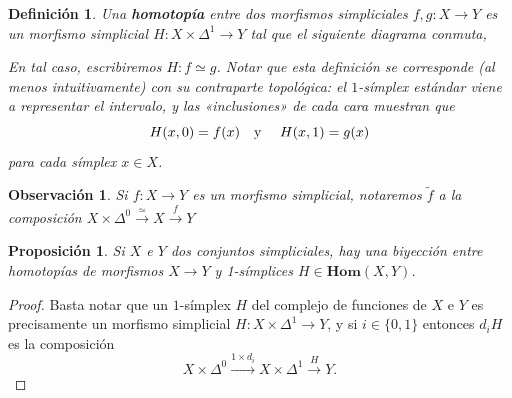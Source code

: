 \documentclass[11pt]{report}
\theoremstyle{colored}
\newtheorem{definition}{Definición}[section]
\newtheorem{proposition}{Proposición}[section]
\newtheorem{remark}{Observación}[section]
\renewcommand{\ss}[1]{\Delta^{#1}}
\newcommand{\homcomplex}{\mathbf{Hom}}
\newcommand{\guill}[1]{«#1»}
\begin{document}
\begin{definition} Una \textbf{homotopía} entre dos morfismos simpliciales $f,g : X \to Y$ es un morfismo simplicial $H : X \times \ss{1} \to Y$ tal que el siguiente diagrama conmuta,
\begin{center}
\end{center}
En tal caso, escribiremos $H : f \simeq g$. Notar que esta definición se corresponde (al menos intuitivamente) con su contraparte topológica: el $1$-símplex estándar viene a representar el intervalo, y las \guill{inclusiones} de cada cara muestran que 
\[
H(x,0) = f(x) \text{\quad y \quad} H(x,1) = g(x)
\]
para cada símplex $x \in X$. 
\end{definition}

\begin{remark} Si $f : X \to Y$ es un morfismo simplicial, notaremos $\widetilde{f}$ a la composición $X \times \ss{0} \xrightarrow{\simeq} X \xrightarrow{f} Y$
\end{remark}

\begin{proposition} Si $X$ e $Y$ dos conjuntos simpliciales, hay una biyección entre homotopías de morfismos $X \to Y$ y 1-símplices $H \in \homcomplex(X,Y)$.
\end{proposition}
\begin{proof} Basta notar que un $1$-símplex $H$ del complejo de funciones de $X$ e $Y$ es precisamente un morfismo simplicial $H : X \times \ss{1} \to Y$, y si $i \in \{0,1\}$ entonces $d_iH$ es la composición
\[
X \times \ss{0} \xrightarrow{1 \times d_i} X \times \ss{1} \xrightarrow{H} Y.
\] 
\end{proof}
\end{document}
